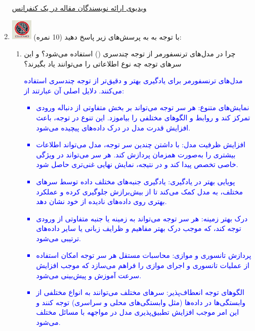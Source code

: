 \documentclass[12pt]{article}
\begin{document}
\begin{enumerate}
    \href{https://www.youtube.com/watch?v=5ZlavKF_98U}{ویدیوی ارائه نویسندگان مقاله در یک کنفرانس}

    \item \includegraphics[width=1cm]{figs/Forbidden_AI.jpg}
    	با توجه به  به پرسش‌های زیر پاسخ دهید (10 نمره):
        \begin{enumerate}
            \item	چرا در مدل‌های ترنسفورمر از توجه چندسری () استفاده می‌شود؟ و این سرهای توجه چه نوع اطلاعاتی را می‌توانند یاد بگیرند؟
            
            \textcolor{blue}{
                مدل‌های ترنسفورمر برای یادگیری بهتر و دقیق‌تر از توجه چندسری استفاده می‌کنند. دلایل اصلی آن عبارتند از:
                \begin{itemize}
                    \item نمایش‌های متنوع:
                    هر سر توجه می‌تواند بر بخش متفاوتی از دنباله ورودی تمرکز کند و روابط و الگوهای مختلفی را بیاموزد. این تنوع در توجه، باعث افزایش قدرت مدل در درک داده‌های پیچیده می‌شود.
                    \item افزایش ظرفیت مدل:
                    با داشتن چندین سر توجه، مدل می‌تواند اطلاعات بیشتری را به‌صورت همزمان پردازش کند. هر سر می‌تواند در ویژگی خاصی تخصص پیدا کند و در نتیجه، نمایش نهایی غنی‌تری حاصل شود.
                    \item پویایی بهتر در یادگیری:
                    یادگیری جنبه‌های مختلف داده توسط سرهای مختلف، به مدل کمک می‌کند تا از بیش‌برازش جلوگیری کرده و عملکرد بهتری روی داده‌های نادیده از خود نشان دهد.
                    \item درک بهتر زمینه:
                    هر سر توجه می‌تواند به زمینه یا جنبه متفاوتی از ورودی توجه کند، که موجب درک بهتر مفاهیم و ظرایف زبانی یا سایر داده‌های ترتیبی می‌شود.
                    \item پردازش تانسوری و موازی:
                    محاسبات مستقل هر سر توجه امکان استفاده از عملیات تانسوری و اجرای موازی را فراهم می‌سازد که موجب افزایش سرعت آموزش و پیش‌بینی می‌شود.
                    \item الگوهای توجه انعطاف‌پذیر:
                    سرهای مختلف می‌توانند به انواع مختلفی از وابستگی‌ها در داده‌ها (مثل وابستگی‌های محلی و سراسری) توجه کنند و این امر موجب افزایش تطبیق‌پذیری مدل در مواجهه با مسائل مختلف می‌شود.
                \end{itemize}}
            

\end{enumerate}
\end{enumerate}
\end{document}
